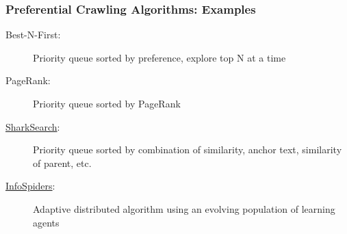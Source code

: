 \documentclass{beamer}
\begin{document}
\begin{frame} \frametitle{Preferential Crawling Algorithms: Examples}

\begin{description}
\item [Best-N-First: ] Priority queue sorted by preference, explore top N at a time %
\item [PageRank:] Priority queue sorted by PageRank
\item [\href{http://www.cs.cmu.edu/~dpelleg/bin/360.html}{SharkSearch}:] Priority queue sorted by combination of
  similarity, anchor text, similarity of parent, etc. %
\item[\href{http://carl.cs.indiana.edu/fil/CAS/PPT/Menczer/}{InfoSpiders}:] Adaptive distributed algorithm using an evolving population of learning agents
\end{description}
\end{frame}
\end{document}
